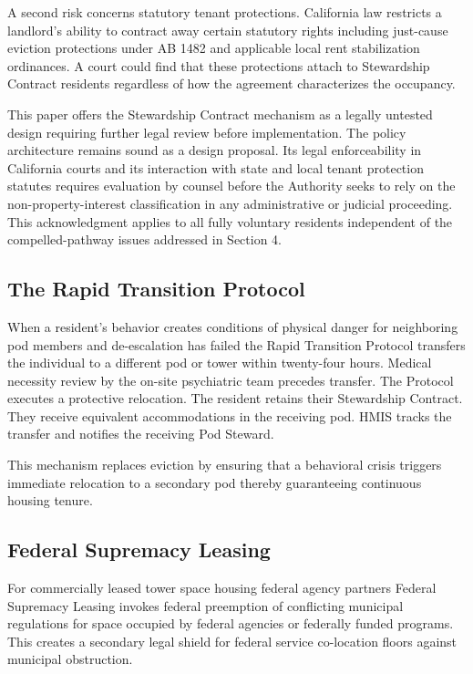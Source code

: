 \documentclass[12pt, letterpaper]{article}
\begin{document}
A second risk concerns statutory tenant protections. California law restricts a landlord's ability to contract away certain statutory rights including just-cause eviction protections under AB 1482 and applicable local rent stabilization ordinances. A court could find that these protections attach to Stewardship Contract residents regardless of how the agreement characterizes the occupancy.

This paper offers the Stewardship Contract mechanism as a legally untested design requiring further legal review before implementation. The policy architecture remains sound as a design proposal. Its legal enforceability in California courts and its interaction with state and local tenant protection statutes requires evaluation by counsel before the Authority seeks to rely on the non-property-interest classification in any administrative or judicial proceeding. This acknowledgment applies to all fully voluntary residents independent of the compelled-pathway issues addressed in Section 4.

\subsection{The Rapid Transition Protocol}

When a resident's behavior creates conditions of physical danger for neighboring pod members and de-escalation has failed the Rapid Transition Protocol transfers the individual to a different pod or tower within twenty-four hours. Medical necessity review by the on-site psychiatric team precedes transfer. The Protocol executes a protective relocation. The resident retains their Stewardship Contract. They receive equivalent accommodations in the receiving pod. HMIS tracks the transfer and notifies the receiving Pod Steward.

This mechanism replaces eviction by ensuring that a behavioral crisis triggers immediate relocation to a secondary pod thereby guaranteeing continuous housing tenure.

\subsection{Federal Supremacy Leasing}

For commercially leased tower space housing federal agency partners Federal Supremacy Leasing invokes federal preemption of conflicting municipal regulations for space occupied by federal agencies or federally funded programs. This creates a secondary legal shield for federal service co-location floors against municipal obstruction.
\end{document}
